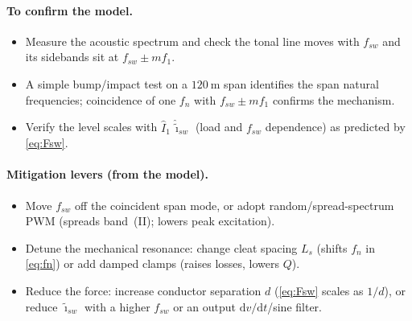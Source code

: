 \documentclass[11pt,a4paper]{article}
\begin{document}
\paragraph{To confirm the model.}
\begin{itemize}[leftmargin=*,nosep]
\item Measure the acoustic spectrum and check the tonal line moves with $f_{sw}$
and its sidebands sit at $f_{sw}\pm m f_1$.
\item A simple bump/impact test on a $120\ \mathrm{m}$ span identifies the span
natural frequencies; coincidence of one $f_n$ with $f_{sw}\pm m f_1$ confirms the
mechanism.
\item Verify the level scales with $\hat I_1\,\hat{\tilde\imath}_{sw}$ (load and
$f_{sw}$ dependence) as predicted by \eqref{eq:Fsw}.
\end{itemize}

\paragraph{Mitigation levers (from the model).}
\begin{itemize}[leftmargin=*,nosep]
\item Move $f_{sw}$ off the coincident span mode, or adopt random/spread-spectrum
PWM (spreads band~(II); lowers peak excitation).
\item Detune the mechanical resonance: change cleat spacing $L_s$ (shifts $f_n$ in
\eqref{eq:fn}) or add damped clamps (raises losses, lowers $Q$).
\item Reduce the force: increase conductor separation $d$ (\eqref{eq:Fsw} scales as
$1/d$), or reduce $\hat{\tilde\imath}_{sw}$ with a higher $f_{sw}$ or an output
$\mathrm{d}v/\mathrm{d}t$/sine filter.
\end{itemize}

\end{document}
